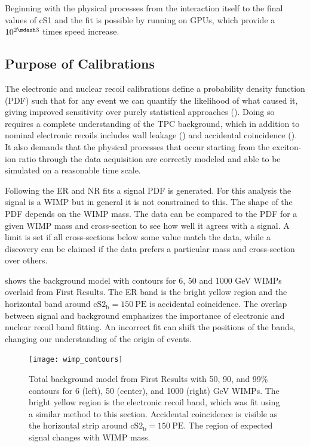 Beginning with the physical processes from the interaction itself to the final values of cS1 and \cstwob the fit is
possible by running on GPUs, which provide a $10^{2 \mdash 3}$ times speed increase.



\subsection{Purpose of Calibrations}
\label{subsec:er_nr_calibrations_purpose}
The electronic and nuclear recoil calibrations define a probability density function (PDF)
such that for any event we can quantify the likelihood of what caused it, giving improved sensitivity over
purely statistical approaches ().  Doing so requires a complete understanding of the TPC background, which
in addition to nominal electronic recoils includes wall leakage () and accidental
coincidence ().  It also demands that
the physical processes that occur starting from the exciton-ion ratio through the data acquisition are correctly modeled and able to be
simulated on a reasonable time scale.

Following the ER and NR fits a signal PDF is generated.  For this analysis the
signal is a WIMP but in general it is not constrained to this.  The shape of the PDF depends on the WIMP mass.  The data can be compared
to the PDF for a given WIMP mass and cross-section to see how well it agrees with a signal.  A limit is set if all cross-sections below
some value match the data, while a discovery can be claimed if the data prefers a particular mass and cross-section over others.

 shows the background model with contours for 6, 50 and 1000 GeV WIMPs overlaid from
First Results.  The ER band is the bright yellow region and the horizontal band around $\mathrm{cS2_b} = 150\ \mathrm{PE}$ is accidental
coincidence.  The overlap between signal and background emphasizes the importance of electronic and nuclear recoil band
fitting.  An incorrect fit can shift the positions of the bands, changing our understanding of the origin of events.

\begin{figure}
\centering
\texttt{[image: wimp\_contours]}
\caption{Total background model from First Results with 50, 90, and 99\% contours for 6 (left), 50 (center), and 1000 (right) GeV
WIMPs.  The bright yellow region is the
electronic recoil band, which was fit using a similar method to this section.  Accidental coincidence is visible as the horizontal strip
around $\mathrm{cS2_b} = 150\ \mathrm{PE}$.  The region of expected signal changes with WIMP mass.}
\label{fig:er_nr_calibrations_purpose_wimp_contours}
\end{figure}



